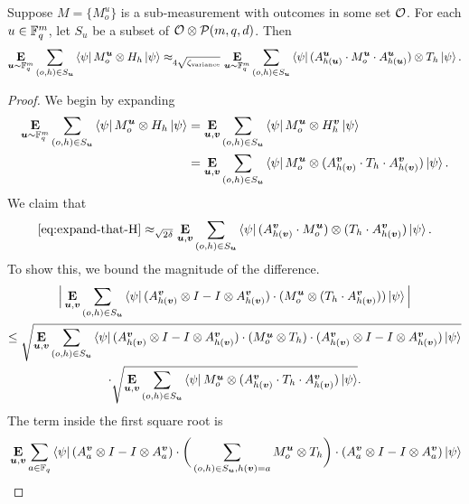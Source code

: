 \begin{lemma}\label{lem:add-in-u}
Suppose $M = \{M^u_o\}$ is a sub-measurement with outcomes in some set $\mathcal{O}$.
For each $u \in \mathbb F_q^m$, let $S_u$ be a subset of $\mathcal{O} \otimes \mathcal{P}(m, q, d)$.
Then
\begin{equation*}
\mathop{\bf E\/}_{\boldsymbol{u} \sim \mathbb F_q^m} \sum_{(o, h) \in S_{\boldsymbol{u}}} \bra{\psi} M^{\boldsymbol{u}}_o \otimes H_h \ket{\psi}
\approx_{4\sqrt{\zeta_{\mathrm{variance}}}} \mathop{\bf E\/}_{\boldsymbol{u} \sim \mathbb F_q^m} \sum_{(o, h) \in S_{\boldsymbol{u}}} \bra{\psi} (A^{\boldsymbol{u}}_{h(\boldsymbol{u})} \cdot M^{\boldsymbol{u}}_o \cdot A^{\boldsymbol{u}}_{h(\boldsymbol{u})}) \otimes T_h \ket{\psi}.
\end{equation*}
\end{lemma}
\begin{proof}
We begin by expanding
\begin{align}
\mathop{\bf E\/}_{\boldsymbol{u} \sim \mathbb F_q^m} \sum_{(o, h) \in S_{\boldsymbol{u}}} \bra{\psi} M^{\boldsymbol{u}}_o \otimes H_h \ket{\psi}
&= \mathop{\bf E\/}_{\boldsymbol{u}, \boldsymbol{v}} \sum_{(o, h) \in S_{\boldsymbol{u}}} \bra{\psi} M^{\boldsymbol{u}}_o \otimes H^{\boldsymbol{v}}_h \ket{\psi}\nonumber\\
&= \mathop{\bf E\/}_{\boldsymbol{u}, \boldsymbol{v}} \sum_{(o, h) \in S_{\boldsymbol{u}}} \bra{\psi} M^{\boldsymbol{u}}_o \otimes (A^{\boldsymbol{v}}_{h(\boldsymbol{v})} \cdot T_h \cdot A^{\boldsymbol{v}}_{h(\boldsymbol{v})}) \ket{\psi}.\label{eq:expand-that-H}
\end{align}
We claim that
\begin{equation}\label{eq:move-one}
\eqref{eq:expand-that-H}
\approx_{\sqrt{2\delta}}
\mathop{\bf E\/}_{\boldsymbol{u}, \boldsymbol{v}} \sum_{(o, h) \in S_{\boldsymbol{u}}} \bra{\psi} (A^{\boldsymbol{v}}_{h(\boldsymbol{v})} \cdot M^{\boldsymbol{u}}_o) \otimes (T_h \cdot A^{\boldsymbol{v}}_{h(\boldsymbol{v})}) \ket{\psi}.
\end{equation}
To show this, we bound the magnitude of the difference.
\begin{multline}
\Big|\mathop{\bf E\/}_{\boldsymbol{u}, \boldsymbol{v}} \sum_{(o, h) \in S_{\boldsymbol{u}}} \bra{\psi} (A^{\boldsymbol{v}}_{h(\boldsymbol{v})} \otimes I - I \otimes A^{\boldsymbol{v}}_{h(\boldsymbol{v})}) \cdot (M^{\boldsymbol{u}}_o \otimes (T_h \cdot A^{\boldsymbol{v}}_{h(\boldsymbol{v})}))\ket{\psi}\Big|\\
\leq
\sqrt{\mathop{\bf E\/}_{\boldsymbol{u}, \boldsymbol{v}} \sum_{(o, h) \in S_{\boldsymbol{u}}} \bra{\psi} (A^{\boldsymbol{v}}_{h(\boldsymbol{v})} \otimes I - I \otimes A^{\boldsymbol{v}}_{h(\boldsymbol{v})}) \cdot (M^{\boldsymbol{u}}_o \otimes T_h) \cdot (A^{\boldsymbol{v}}_{h(\boldsymbol{v})} \otimes I - I \otimes A^{\boldsymbol{v}}_{h(\boldsymbol{v})}) \ket{\psi}}\\
\cdot \sqrt{\mathop{\bf E\/}_{\boldsymbol{u}, \boldsymbol{v}} \sum_{(o, h) \in S_{\boldsymbol{u}}} \bra{\psi}  M^{\boldsymbol{u}}_o \otimes (A^{\boldsymbol{v}}_{h(\boldsymbol{v})} \cdot T_h\cdot  A^{\boldsymbol{v}}_{h(\boldsymbol{v})}) \ket{\psi}}.\label{eq:move-one-cauchy-schwarz}
\end{multline}
The term inside the first square root is
\begin{align*}
&\E_{\bu, \bv} \sum_{a \in \F_q} \bra{\psi} (A^{\bv}_a \otimes I - I \otimes A^{\bv}_a) \cdot \bigg( \sum_{(o, h) \in S_{\bu},h(\bv) = a}M^{\bu}_o \otimes T_h\bigg) \cdot (A^{\bv}_a \otimes I - I \otimes A^{\bv}_a) \ket{\psi}\\

\end{align*}
\end{proof}
